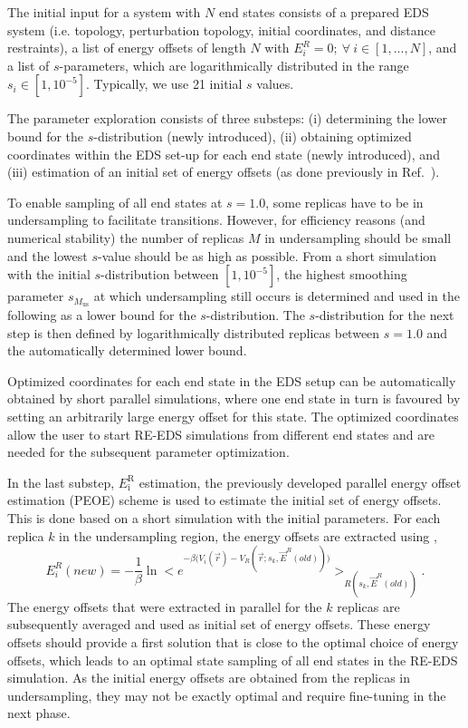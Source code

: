 %
The initial input for a system with $N$ end states consists of a prepared EDS system (i.e. topology,  perturbation topology, initial coordinates, and distance restraints), a list of energy offsets of length $N$ with $E_i^R = 0; ~ \forall ~ i \in [1,...,N]$, and a list of $s$-parameters, which are logarithmically distributed in the range $s_i \in [1, 10^{-5}]$. Typically, we use 21 initial $s$ values. 

The parameter exploration consists of three substeps: (i) determining the lower bound for the $s$-distribution (newly introduced), (ii) obtaining optimized coordinates within the EDS set-up for each end state (newly introduced), and (iii) estimation of an initial set of energy offsets (as done previously in Ref.~\cite{Sidler2016}).

To enable sampling of all end states at $s=1.0$, some replicas have to be in undersampling to facilitate transitions. However, for efficiency reasons (and numerical stability) the number of replicas $M$ in undersampling should be small and the lowest $s$-value should be as high as possible. From a short simulation with the initial $s$-distribution between $[1, 10^{-5}]$, the highest smoothing parameter $s_{M_\mathrm{us}}$ at which undersampling still occurs is determined and used in the following as a lower bound for the $s$-distribution. The $s$-distribution for the next step is then defined by logarithmically distributed replicas between $s=1.0$ and the automatically determined lower bound.

Optimized coordinates for each end state in the EDS setup can be automatically obtained by short parallel simulations, where one end state in turn is favoured by setting an arbitrarily large energy offset for this state. 
The optimized coordinates allow the user to start RE-EDS simulations from different end states and are needed for the subsequent parameter optimization. 

In the last substep, $E_{\text{i}}^{\text{R}}$ estimation, the previously developed parallel energy offset estimation (PEOE) \cite{Sidler2016} scheme is used to estimate the initial set of energy offsets. This is done based on a short simulation with the initial parameters. For each replica $k$ in the undersampling region, the energy offsets are extracted using \cite{Sidler2016},
\begin{equation}
    E_{i}^{R}(new)=-\frac{1}{\beta}\ln \Big < e^{-\beta \big(V_i(\vec{r})-V_R(\vec{r}; s_{k},\vec{E}^{R}(old))\big)}\Big>_{R(s_{k},\vec{E}^{R}(old))} .
    \label{eq: EoffEstimator}
\end{equation}
The energy offsets that were extracted in parallel for the $k$ replicas are subsequently averaged and used as initial set of energy offsets. These energy offsets should provide a first solution that is close to the optimal choice of energy offsets, which leads to an optimal state sampling of all end states in the RE-EDS simulation. As the initial energy offsets are obtained from the replicas in undersampling, they may not be exactly optimal and require fine-tuning in the next phase. 


